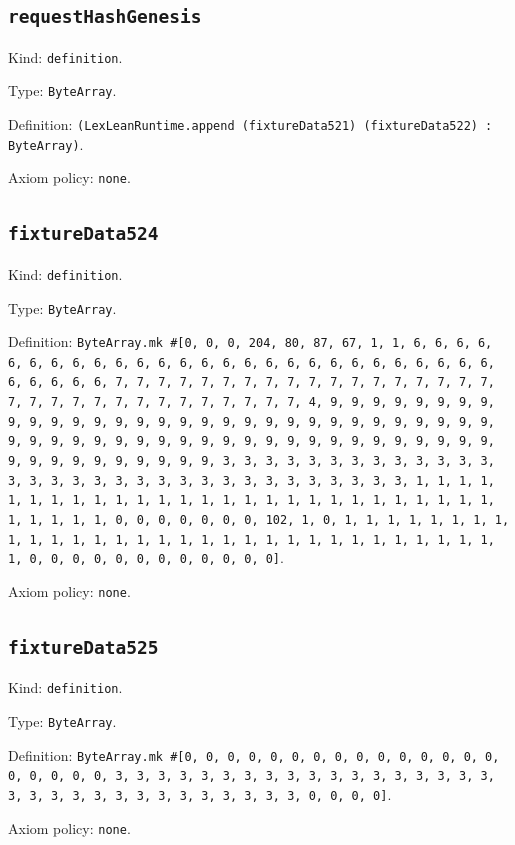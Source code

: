 \documentclass[11pt]{article}
\begin{document}
\subsection*{\texttt{requestHashGenesis}}
\noindent Kind: \texttt{definition}.\par
\noindent Type: \texttt{ByteArray}.\par
\noindent Definition: \texttt{(LexLeanRuntime.append (fixtureData521) (fixtureData522) : ByteArray)}.\par
\noindent Axiom policy: \texttt{none}.\par
\subsection*{\texttt{fixtureData524}}
\noindent Kind: \texttt{definition}.\par
\noindent Type: \texttt{ByteArray}.\par
\noindent Definition: \texttt{ByteArray.mk \#[0, 0, 0, 204, 80, 87, 67, 1, 1, 6, 6, 6, 6, 6, 6, 6, 6, 6, 6, 6, 6, 6, 6, 6, 6, 6, 6, 6, 6, 6, 6, 6, 6, 6, 6, 6, 6, 6, 6, 6, 6, 7, 7, 7, 7, 7, 7, 7, 7, 7, 7, 7, 7, 7, 7, 7, 7, 7, 7, 7, 7, 7, 7, 7, 7, 7, 7, 7, 7, 7, 7, 7, 7, 4, 9, 9, 9, 9, 9, 9, 9, 9, 9, 9, 9, 9, 9, 9, 9, 9, 9, 9, 9, 9, 9, 9, 9, 9, 9, 9, 9, 9, 9, 9, 9, 9, 9, 9, 9, 9, 9, 9, 9, 9, 9, 9, 9, 9, 9, 9, 9, 9, 9, 9, 9, 9, 9, 9, 9, 9, 9, 9, 9, 9, 9, 9, 9, 9, 3, 3, 3, 3, 3, 3, 3, 3, 3, 3, 3, 3, 3, 3, 3, 3, 3, 3, 3, 3, 3, 3, 3, 3, 3, 3, 3, 3, 3, 3, 3, 3, 1, 1, 1, 1, 1, 1, 1, 1, 1, 1, 1, 1, 1, 1, 1, 1, 1, 1, 1, 1, 1, 1, 1, 1, 1, 1, 1, 1, 1, 1, 1, 1, 0, 0, 0, 0, 0, 0, 0, 102, 1, 0, 1, 1, 1, 1, 1, 1, 1, 1, 1, 1, 1, 1, 1, 1, 1, 1, 1, 1, 1, 1, 1, 1, 1, 1, 1, 1, 1, 1, 1, 1, 1, 1, 0, 0, 0, 0, 0, 0, 0, 0, 0, 0, 0, 0]}.\par
\noindent Axiom policy: \texttt{none}.\par
\subsection*{\texttt{fixtureData525}}
\noindent Kind: \texttt{definition}.\par
\noindent Type: \texttt{ByteArray}.\par
\noindent Definition: \texttt{ByteArray.mk \#[0, 0, 0, 0, 0, 0, 0, 0, 0, 0, 0, 0, 0, 0, 0, 0, 0, 0, 0, 0, 3, 3, 3, 3, 3, 3, 3, 3, 3, 3, 3, 3, 3, 3, 3, 3, 3, 3, 3, 3, 3, 3, 3, 3, 3, 3, 3, 3, 3, 3, 3, 3, 0, 0, 0, 0]}.\par
\noindent Axiom policy: \texttt{none}.\par
\end{document}
